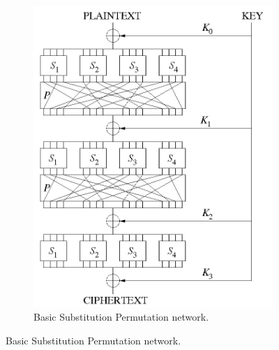 \documentclass[12pt,twoside,a4paper]{report}
\begin{document}
\begin{figure}[H]
\begin{subfigure}[H]{0.5\textwidth}
            \includegraphics[width=\textwidth]{SP}
            \centering
            \caption{Basic Substitution Permutation network.}
            \label{SP}
    \end{subfigure}
    \end{figure}
    
    
    
\end{document}
